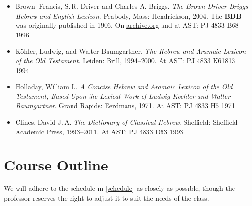 \documentclass[titlepage]{article}
\begin{document}
\begin{itemize}
    \begin{itemize}
      \item
        Brown, Francis, S.\,R. Driver and Charles A. Briggs. \emph{The
        Brown-Driver-Briggs Hebrew and English Lexicon}. Peabody, Mass:
        Hendrickson, 2004. The \textbf{BDB} was originally published in 1906.
        On \href{https://archive.org/details/hebrewenglishlex00geseuoft}{archive.org}
        and at AST: PJ 4833 B68 1996
      \item
        Köhler, Ludwig, and Walter Baumgartner. \emph{The Hebrew
        and Aramaic Lexicon of the Old Testament}. Leiden: Brill,
        1994--2000.
        At AST: PJ 4833 K61813 1994
      \item
        Holladay, William L. \emph{A Concise Hebrew and Aramaic Lexicon
        of the Old Testament, Based Upon the Lexical Work of Ludwig
        Koehler and Walter Baumgartner}.
        Grand Rapids: Eerdmans, 1971.
        At AST: PJ 4833 H6 1971
      \item
        Clines, David J.\,A. \emph{The Dictionary of Classical Hebrew}.
        Sheffield: Sheffield Academic Press, 1993--2011.
        At AST: PJ 4833 D53 1993
    \end{itemize}

\end{itemize}


\section{Course Outline}
\label{outline}

We will adhere to the schedule in \autoref{schedule} as closely as
possible, though the professor reserves the right to adjust it to suit
the needs of the class.
\end{document}
